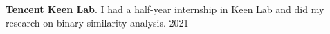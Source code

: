 
\textbf{Tencent Keen Lab}. I had a half-year internship in Keen Lab and did my research on binary similarity analysis. \hfill 2021

